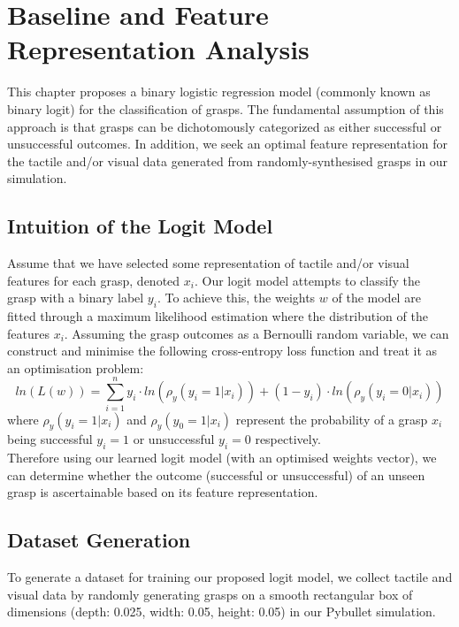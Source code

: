 \documentclass[11pt, a4paper]{report}
\begin{document}
\chapter{Baseline and Feature Representation Analysis}
\label{chap:4}
This chapter proposes a binary logistic regression model (commonly known as binary logit) for the classification of grasps. The fundamental assumption of this approach is that grasps can be dichotomously categorized as either successful or unsuccessful outcomes. In addition, we seek an optimal feature representation for the tactile and/or visual data generated from randomly-synthesised grasps in our simulation.


\section{Intuition of the Logit Model}
\label{sec:4.1}
Assume that we have selected some representation of tactile and/or visual features for each grasp, denoted $x_i$. Our logit model attempts to classify the grasp with a binary label $y_i$. To achieve this, the weights $w$ of the model are fitted through a maximum likelihood estimation where the distribution of the features $x_i$. Assuming the grasp outcomes as a Bernoulli random variable, we can construct and minimise the following cross-entropy loss function and treat it as an optimisation problem:
\begin{equation}
    ln(L(w))=\sum^n_{i=1}y_i\cdot ln(\rho_y(y_i=1|x_i))+(1-y_i)\cdot ln(\rho_y(y_i=0|x_i))
\end{equation}
where $\rho_y(y_i=1|x_i)$ and $\rho_y(y_0=1|x_i)$ represent the probability of a grasp $x_i$ being successful $y_i=1$ or unsuccessful $y_i=0$ respectively.\\

Therefore using our learned logit model (with an optimised weights vector), we can determine whether the outcome (successful or unsuccessful) of an unseen grasp is ascertainable based on its feature representation.


\section{Dataset Generation}
\label{sec:4.2}
To generate a dataset for training our proposed logit model, we collect tactile and visual data by randomly generating grasps on a smooth rectangular box of dimensions (depth: 0.025, width: 0.05, height: 0.05) in our Pybullet simulation.
\end{document}
